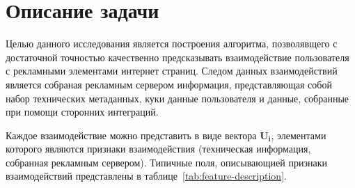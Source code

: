 \section{Описание задачи}

Целью данного исследования является построения алгоритма, позволявщего с достаточной точностью качественно
предсказывать взаимодействие пользователя с рекламными элементами интернет страниц.
Следом данных взаимодействий является собраная рекламным сервером информация, представляющая собой набор
технических метаданных, куки данные пользователя и данные, собранные при помощи сторонних интеграций.

Каждое взаимодействие можно представить в виде вектора $\mathbf{U_i}$, элементами которого являются признаки
взаимодействия (техническая информация, собранная рекламным сервером). Типичные поля, описывающией признаки 
взаимодействий представлены в таблице~\ref{tab:feature-description}.

